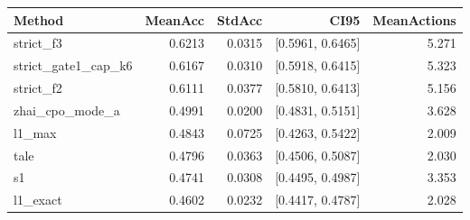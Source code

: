 \begin{tabular}{lrrrr}
\hline
Method & MeanAcc & StdAcc & CI95 & MeanActions \\
\hline
strict_f3 & 0.6213 & 0.0315 & [0.5961, 0.6465] & 5.271 \\
strict_gate1_cap_k6 & 0.6167 & 0.0310 & [0.5918, 0.6415] & 5.323 \\
strict_f2 & 0.6111 & 0.0377 & [0.5810, 0.6413] & 5.156 \\
zhai_cpo_mode_a & 0.4991 & 0.0200 & [0.4831, 0.5151] & 3.628 \\
l1_max & 0.4843 & 0.0725 & [0.4263, 0.5422] & 2.009 \\
tale & 0.4796 & 0.0363 & [0.4506, 0.5087] & 2.030 \\
s1 & 0.4741 & 0.0308 & [0.4495, 0.4987] & 3.353 \\
l1_exact & 0.4602 & 0.0232 & [0.4417, 0.4787] & 2.028 \\
\hline
\end{tabular}
